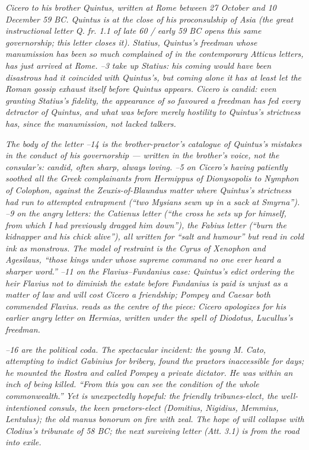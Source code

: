 
\textit{Cicero to his brother Quintus, written at Rome between
27 October and 10 December 59 BC. Quintus is at the close of
his proconsulship of Asia (the great instructional letter
\textit{Q. fr.} 1.1 of late 60 / early 59 BC opens this same
governorship; this letter closes it). Statius, Quintus's
freedman whose manumission has been so much complained of in
the contemporary Atticus letters, has just arrived at Rome.
--3 take up Statius: his coming would have been
disastrous had it coincided with Quintus's, but coming alone
it has at least let the Roman gossip exhaust itself before
Quintus appears. Cicero is candid: even granting Statius's
fidelity, the appearance of so favoured a freedman has fed
every detractor of Quintus, and what was before merely
hostility to Quintus's strictness has, since the manumission,
not lacked talkers.}

\textit{The body of the letter --14 is the
brother-praetor's catalogue of Quintus's mistakes in the
conduct of his governorship --- written in the brother's
voice, not the consular's: candid, often sharp, always
loving. --5 on Cicero's having patiently soothed
all the Greek complainants from Hermippus of Dionysopolis to
Nymphon of Colophon, against the Zeuxis-of-Blaundus matter
where Quintus's strictness had run to attempted entrapment
(``two Mysians sewn up in a sack at Smyrna''). --9 on the angry letters: the Catienus letter (``the cross
he sets up for himself, from which I had previously dragged
him down''), the Fabius letter (``burn the kidnapper and his
chick alive''), all written for ``salt and humour'' but read
in cold ink as monstrous. The model of restraint is the
Cyrus of Xenophon and Agesilaus, ``those kings under whose
supreme command no one ever heard a sharper word.''
--11 on the Flavius--Fundanius case: Quintus's
edict ordering the heir Flavius not to diminish the estate
before Fundanius is paid is unjust as a matter of law and
will cost Cicero a friendship; Pompey and Caesar both
commended Flavius.  reads as the centre of the
piece: Cicero apologizes for his earlier angry letter on
Hermias, written under the spell of Diodotus, Lucullus's
freedman.}

\textit{--16 are the political coda. The
spectacular incident: the young M. Cato, attempting to indict
Gabinius for bribery, found the praetors inaccessible for
days; he mounted the Rostra and called Pompey \textit{a
private dictator}. He was within an inch of being killed.
``From this you can see the condition of the whole
commonwealth.'' Yet  is unexpectedly hopeful:
the friendly tribunes-elect, the well-intentioned consuls,
the keen praetors-elect (Domitius, Nigidius, Memmius,
Lentulus); the old \textit{manus bonorum} on fire with zeal.
The hope of  will collapse with Clodius's
tribunate of 58 BC; the next surviving letter (\textit{Att.}
3.1) is from the road into exile.}
